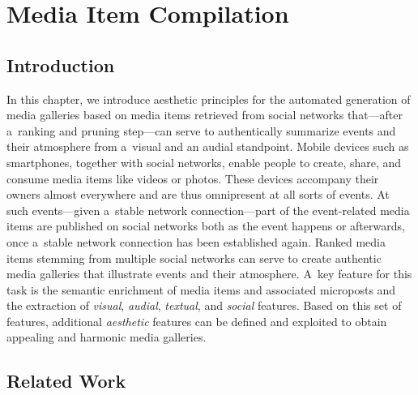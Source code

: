 \chapter{Media Item Compilation}
\label{cha:media-item-compilation}

\ifpdf
    \graphicspath{{10_media_item_compilation/figures/PNG/}{10_media_item_compilation/figures/PDF/}{10_media_item_compilation/figures/}}
\else
    \graphicspath{{10_media_item_compilation/figures/EPS/}{10_media_item_compilation/figures/}}
\fi

\section{Introduction}

In this chapter, we introduce aesthetic principles
for the automated generation of media galleries
based on media items retrieved from social networks
that---after a~ranking and pruning step---can serve to authentically
summarize events and their atmosphere from a~visual
and an audial standpoint.
Mobile devices such as smartphones, together with social networks,
enable people to create, share, and consume media items
like videos or photos.
These devices accompany their owners almost everywhere
and are thus omnipresent at all sorts of events.
At such events---given a~stable network connection---part of
the event-related media items are published on social networks
both as the event happens or afterwards,
once a~stable network connection has been established again.
Ranked media items stemming from multiple social networks
can serve to create authentic media galleries
that illustrate events and their atmosphere.
A~key feature for this task is the semantic enrichment
of media items and associated microposts
and the extraction of \emph{visual}, \emph{audial},
\emph{textual}, and \emph{social} features.
Based on this set of features,
additional \emph{aesthetic} features
can be defined and exploited to obtain appealing
and harmonic media galleries.

\section{Related Work}

